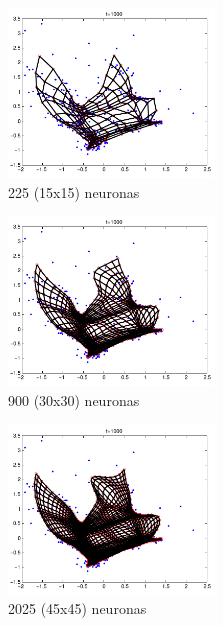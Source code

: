 \documentclass[informe.tex]{subfiles}
\begin{document}
       \begin{minipage}{0.30\textwidth}
	\centering
	\begin{figure}[H]
	  \centering
	  \includegraphics[height=4.5cm,keepaspectratio]{graficos/malla/15x15.png}
                \caption{\small 225 (15x15) neuronas}
	\end{figure}
	
	\begin{figure}[H]
	  \centering
	  \includegraphics[height=4.5cm,keepaspectratio]{graficos/malla/30x30.png}
                \caption{\small 900 (30x30) neuronas}
	\end{figure}
	
	\begin{figure}[H]
	  \centering
	  \includegraphics[height=4.5cm,keepaspectratio]{graficos/malla/45x45.png}
                \caption{\small 2025 (45x45) neuronas}
	\end{figure}
      \end{minipage}
      
      \FloatBarrier
      \vspace{15pt}
      \FloatBarrier
      
\end{document}

